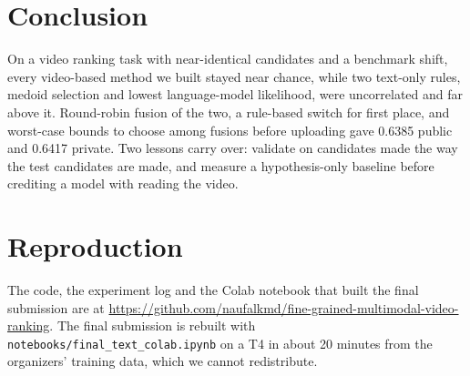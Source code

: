 \documentclass[10pt,twocolumn]{article}
\begin{document}
\section{Conclusion}

On a video ranking task with near-identical candidates and a benchmark shift, every video-based method we built
stayed near chance, while two text-only rules, medoid selection and lowest language-model likelihood, were
uncorrelated and far above it. Round-robin fusion of the two, a rule-based switch for first place, and worst-case
bounds to choose among fusions before uploading gave 0.6385 public and 0.6417 private. Two lessons carry over:
validate on candidates made the way the test candidates are made, and measure a hypothesis-only baseline before
crediting a model with reading the video.




\appendix
\section{Reproduction}
The code, the experiment log and the Colab notebook that built the final submission are at
\url{https://github.com/naufalkmd/fine-grained-multimodal-video-ranking}. The final submission is rebuilt with
\texttt{notebooks/final\_text\_colab.ipynb} on a T4 in about 20 minutes from the organizers' training data, which
we cannot redistribute.
\end{document}
